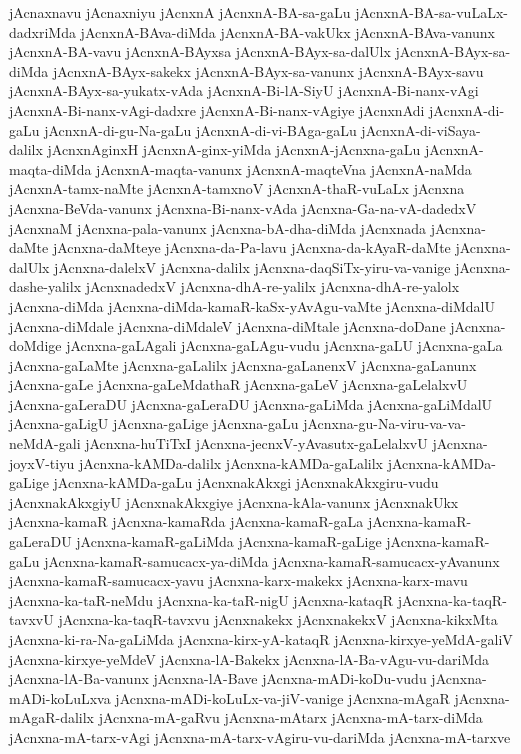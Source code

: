 {jAcnaxnavu
jAcnaxniyu
jAcnxnA
jAcnxnA-BA-sa-gaLu
jAcnxnA-BA-sa-vuLaLx-dadxriMda
jAcnxnA-BAva-diMda
jAcnxnA-BA-vakUkx
jAcnxnA-BAva-vanunx
jAcnxnA-BA-vavu
jAcnxnA-BAyxsa
jAcnxnA-BAyx-sa-dalUlx
jAcnxnA-BAyx-sa-diMda
jAcnxnA-BAyx-sakekx
jAcnxnA-BAyx-sa-vanunx
jAcnxnA-BAyx-savu
jAcnxnA-BAyx-sa-yukatx-vAda
jAcnxnA-Bi-lA-SiyU
jAcnxnA-Bi-nanx-vAgi
jAcnxnA-Bi-nanx-vAgi-dadxre
jAcnxnA-Bi-nanx-vAgiye
jAcnxnAdi
jAcnxnA-di-gaLu
jAcnxnA-di-gu-Na-gaLu
jAcnxnA-di-vi-BAga-gaLu
jAcnxnA-di-viSaya-dalilx
jAcnxnAginxH
jAcnxnA-ginx-yiMda
jAcnxnA-jAcnxna-gaLu
jAcnxnA-maqta-diMda
jAcnxnA-maqta-vanunx
jAcnxnA-maqteVna
jAcnxnA-naMda
jAcnxnA-tamx-naMte
jAcnxnA-tamxnoV
jAcnxnA-thaR-vuLaLx
jAcnxna
jAcnxna-BeVda-vanunx
jAcnxna-Bi-nanx-vAda
jAcnxna-Ga-na-vA-dadedxV
jAcnxnaM
jAcnxna-pala-vanunx
jAcnxna-bA-dha-diMda
jAcnxnada
jAcnxna-daMte
jAcnxna-daMteye
jAcnxna-da-Pa-lavu
jAcnxna-da-kAyaR-daMte
jAcnxna-dalUlx
jAcnxna-dalelxV
jAcnxna-dalilx
jAcnxna-daqSiTx-yiru-va-vanige
jAcnxna-dashe-yalilx
jAcnxnadedxV
jAcnxna-dhA-re-yalilx
jAcnxna-dhA-re-yalolx
jAcnxna-diMda
jAcnxna-diMda-kamaR-kaSx-yAvAgu-vaMte
jAcnxna-diMdalU
jAcnxna-diMdale
jAcnxna-diMdaleV
jAcnxna-diMtale
jAcnxna-doDane
jAcnxna-doMdige
jAcnxna-gaLAgali
jAcnxna-gaLAgu-vudu
jAcnxna-gaLU
jAcnxna-gaLa
jAcnxna-gaLaMte
jAcnxna-gaLalilx
jAcnxna-gaLanenxV
jAcnxna-gaLanunx
jAcnxna-gaLe
jAcnxna-gaLeMdathaR
jAcnxna-gaLeV
jAcnxna-gaLelalxvU
jAcnxna-gaLeraDU
jAcnxna-gaLeraDU
jAcnxna-gaLiMda
jAcnxna-gaLiMdalU
jAcnxna-gaLigU
jAcnxna-gaLige
jAcnxna-gaLu
jAcnxna-gu-Na-viru-va-va-neMdA-gali
jAcnxna-huTiTxI
jAcnxna-jecnxV-yAvasutx-gaLelalxvU
jAcnxna-joyxV-tiyu
jAcnxna-kAMDa-dalilx
jAcnxna-kAMDa-gaLalilx
jAcnxna-kAMDa-gaLige
jAcnxna-kAMDa-gaLu
jAcnxnakAkxgi
jAcnxnakAkxgiru-vudu
jAcnxnakAkxgiyU
jAcnxnakAkxgiye
jAcnxna-kAla-vanunx
jAcnxnakUkx
jAcnxna-kamaR
jAcnxna-kamaRda
jAcnxna-kamaR-gaLa
jAcnxna-kamaR-gaLeraDU
jAcnxna-kamaR-gaLiMda
jAcnxna-kamaR-gaLige
jAcnxna-kamaR-gaLu
jAcnxna-kamaR-samucacx-ya-diMda
jAcnxna-kamaR-samucacx-yAvanunx
jAcnxna-kamaR-samucacx-yavu
jAcnxna-karx-makekx
jAcnxna-karx-mavu
jAcnxna-ka-taR-neMdu
jAcnxna-ka-taR-nigU
jAcnxna-kataqR
jAcnxna-ka-taqR-tavxvU
jAcnxna-ka-taqR-tavxvu
jAcnxnakekx
jAcnxnakekxV
jAcnxna-kikxMta
jAcnxna-ki-ra-Na-gaLiMda
jAcnxna-kirx-yA-kataqR
jAcnxna-kirxye-yeMdA-galiV
jAcnxna-kirxye-yeMdeV
jAcnxna-lA-Bakekx
jAcnxna-lA-Ba-vAgu-vu-dariMda
jAcnxna-lA-Ba-vanunx
jAcnxna-lA-Bave
jAcnxna-mADi-koDu-vudu
jAcnxna-mADi-koLuLxva
jAcnxna-mADi-koLuLx-va-jiV-vanige
jAcnxna-mAgaR
jAcnxna-mAgaR-dalilx
jAcnxna-mA-gaRvu
jAcnxna-mAtarx
jAcnxna-mA-tarx-diMda
jAcnxna-mA-tarx-vAgi
jAcnxna-mA-tarx-vAgiru-vu-dariMda
jAcnxna-mA-tarxve
}
